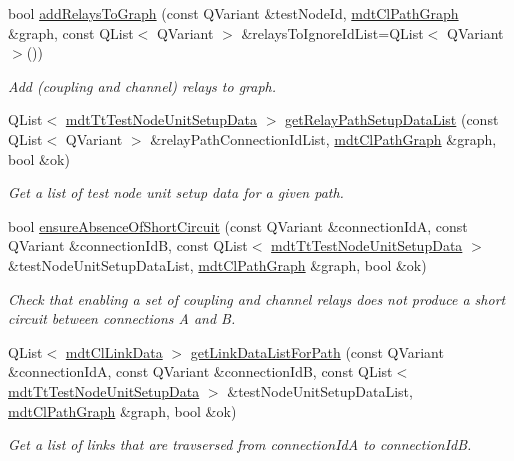 \begin{DoxyCompactItemize}
bool \hyperlink{classmdt_tt_test_node_ade83e368a3cff8fe6704e3c194d5e211}{add\-Relays\-To\-Graph} (const Q\-Variant \&test\-Node\-Id, \hyperlink{classmdt_cl_path_graph}{mdt\-Cl\-Path\-Graph} \&graph, const Q\-List$<$ Q\-Variant $>$ \&relays\-To\-Ignore\-Id\-List=Q\-List$<$ Q\-Variant $>$())
\begin{DoxyCompactList}\small\item\em Add (coupling and channel) relays to graph. \end{DoxyCompactList}\item 
Q\-List$<$ \hyperlink{classmdt_tt_test_node_unit_setup_data}{mdt\-Tt\-Test\-Node\-Unit\-Setup\-Data} $>$ \hyperlink{classmdt_tt_test_node_a2953e3744cd95cab94ef35a7fb308d12}{get\-Relay\-Path\-Setup\-Data\-List} (const Q\-List$<$ Q\-Variant $>$ \&relay\-Path\-Connection\-Id\-List, \hyperlink{classmdt_cl_path_graph}{mdt\-Cl\-Path\-Graph} \&graph, bool \&ok)
\begin{DoxyCompactList}\small\item\em Get a list of test node unit setup data for a given path. \end{DoxyCompactList}\item 
bool \hyperlink{classmdt_tt_test_node_a0e96e3c1ab7b93ec5b7f2b02be44a1ff}{ensure\-Absence\-Of\-Short\-Circuit} (const Q\-Variant \&connection\-Id\-A, const Q\-Variant \&connection\-Id\-B, const Q\-List$<$ \hyperlink{classmdt_tt_test_node_unit_setup_data}{mdt\-Tt\-Test\-Node\-Unit\-Setup\-Data} $>$ \&test\-Node\-Unit\-Setup\-Data\-List, \hyperlink{classmdt_cl_path_graph}{mdt\-Cl\-Path\-Graph} \&graph, bool \&ok)
\begin{DoxyCompactList}\small\item\em Check that enabling a set of coupling and channel relays does not produce a short circuit between connections A and B. \end{DoxyCompactList}\item 
Q\-List$<$ \hyperlink{classmdt_cl_link_data}{mdt\-Cl\-Link\-Data} $>$ \hyperlink{classmdt_tt_test_node_af56a87ad9fb3a1e0fa86cf1cee75be1a}{get\-Link\-Data\-List\-For\-Path} (const Q\-Variant \&connection\-Id\-A, const Q\-Variant \&connection\-Id\-B, const Q\-List$<$ \hyperlink{classmdt_tt_test_node_unit_setup_data}{mdt\-Tt\-Test\-Node\-Unit\-Setup\-Data} $>$ \&test\-Node\-Unit\-Setup\-Data\-List, \hyperlink{classmdt_cl_path_graph}{mdt\-Cl\-Path\-Graph} \&graph, bool \&ok)
\begin{DoxyCompactList}\small\item\em Get a list of links that are travsersed from connection\-Id\-A to connection\-Id\-B. \end{DoxyCompactList}\end{DoxyCompactItemize}
